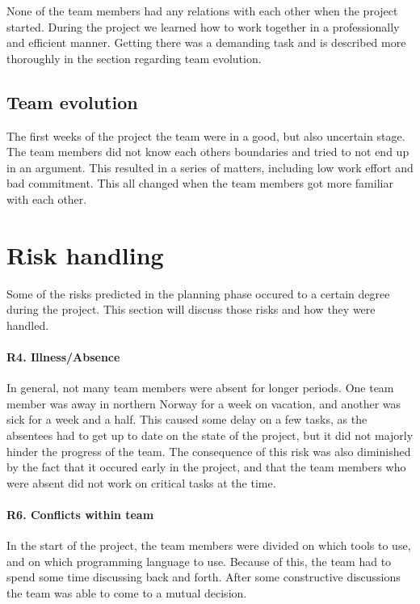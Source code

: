 None of the team members had any relations with each other when the project started. During the project we learned how to work together in a professionally and efficient manner. Getting there was a demanding task and is described more thoroughly in the section regarding team evolution.

\subsection{Team evolution}
The first weeks of the project the team were in a good, but also uncertain stage. The team members did not know each others boundaries and tried to not end up in an argument. This resulted in a series of matters, including low work effort and bad commitment. This all changed when the team members got more familiar with each other.   

\section{Risk handling}
Some of the risks predicted in the planning phase occured to a certain degree during the project.
This section will discuss those risks and how they were handled.

\paragraph{R4. Illness/Absence}
In general, not many team members were absent for longer periods.
One team member was away in northern Norway for a week on vacation, and another was sick for a week and a half. This caused some delay on a few tasks, as the absentees had to get up to date on the state of the project, but it did not majorly hinder the progress of the team. The consequence of this risk was also diminished by the fact that it occured early in the project, and that the team members who were absent did not work on critical tasks at the time.

\paragraph{R6. Conflicts within team}
In the start of the project, the team members were divided on which tools to use, and on which programming language to use. Because of this, the team had to spend some time discussing back and forth. After some constructive discussions the team was able to come to a mutual decision.

